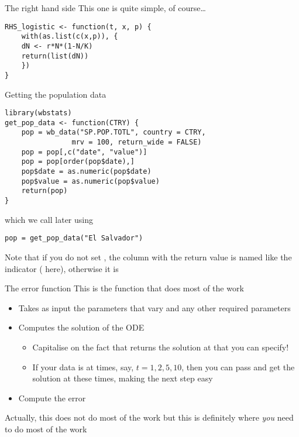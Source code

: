 \documentclass[aspectratio=169]{beamer}
\begin{document}
\begin{frame}[fragile]{The right hand side}
This one is quite simple, of course\ldots
\vfill
\begin{lstlisting}
RHS_logistic <- function(t, x, p) {
    with(as.list(c(x,p)), {
    dN <- r*N*(1-N/K)
    return(list(dN))
    })
}    
\end{lstlisting}
\end{frame}

\begin{frame}[fragile]{Getting the population data}
\begin{lstlisting}
library(wbstats)
get_pop_data <- function(CTRY) {
    pop = wb_data("SP.POP.TOTL", country = CTRY,
                mrv = 100, return_wide = FALSE)
    pop = pop[,c("date", "value")]
    pop = pop[order(pop$date),]
    pop$date = as.numeric(pop$date)
    pop$value = as.numeric(pop$value)
    return(pop)
}    
\end{lstlisting}
which we call later using
\begin{lstlisting}
pop = get_pop_data("El Salvador")
\end{lstlisting}
\vfill
Note that if you do not set , the column with the return value is named like the indicator ( here), otherwise it is 
\end{frame}


\begin{frame}{The error function}
    This is the function that does most of the work
    \vfill
    \begin{itemize}
        \item Takes as input the parameters that vary and any other required parameters
        \item Computes the solution of the ODE
        \begin{itemize}
            \item Capitalise on the fact that  returns the solution at  that you can specify!
            \item If your data is at times, say, $t=1,2,5,10$, then you can pass  and get the solution at these times, making the next step easy
        \end{itemize}
        \item Compute the error
    \end{itemize}
    \vfill
    Actually, this does not do most of the work but this is definitely where \emph{you} need to do most of the work
\end{frame}
\end{document}
